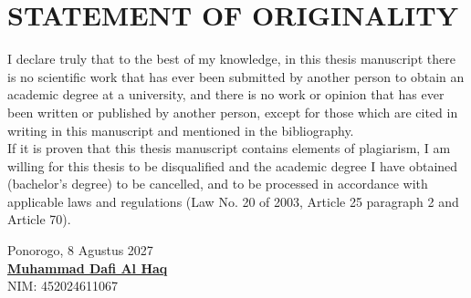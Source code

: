 \chapter*{STATEMENT OF ORIGINALITY}
\thispagestyle{empty}

I declare truly that to the best of my knowledge, in this thesis manuscript there is no scientific work that has ever been submitted by another person to obtain an academic degree at a university, and there is no work or opinion that has ever been written or published by another person, except for those which are cited in writing in this manuscript and mentioned in the bibliography.\\

If it is proven that this thesis manuscript contains elements of plagiarism, I am willing for this thesis to be disqualified and the academic degree I have obtained (bachelor's degree) to be cancelled, and to be processed in accordance with applicable laws and regulations (Law No. 20 of 2003, Article 25 paragraph 2 and Article 70).\\

\begin{flushright}
	\begin{minipage}{5cm} 
		Ponorogo, 8 Agustus 2027
		\vspace{3cm}\\
		\centering\textbf{\underline{Muhammad Dafi Al Haq}}\\
		\centering NIM: 452024611067\\
	\end{minipage}
\end{flushright}